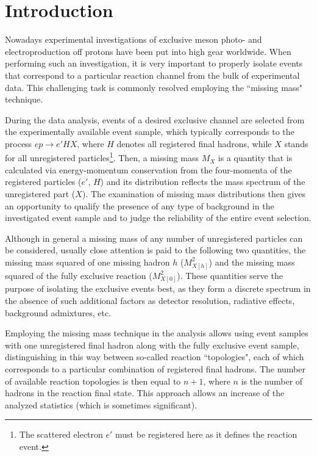 \newpage
\chapter{Introduction}
\mbox{}\vspace{-\baselineskip}


Nowadays experimental investigations of exclusive meson photo- and electroproduction off protons have been put into high gear worldwide. When performing such an investigation, it is very important to properly isolate events that correspond to a particular reaction channel from the bulk of experimental data. This challenging task is commonly resolved employing the ``missing mass" technique.

During the data analysis, events of a desired exclusive channel are selected from the experimentally available event sample, which typically corresponds to the process $ep \rightarrow e'HX$, where $H$ denotes all registered final hadrons, while $X$ stands for all unregistered particles\footnote[1]{The scattered electron $e'$ must be registered here as it defines the reaction event.}. Then, a missing mass $M_{X}$ is a quantity that is calculated via energy-momentum conservation from the four-momenta of the registered particles ($e'$, $H$) and its distribution reflects the mass spectrum of the unregistered part ($X$). The examination of missing mass distributions then gives an opportunity to qualify the presence of any type of background in the investigated event sample and to judge the reliability of the entire event selection.


Although in general a missing mass of any number of unregistered particles can be considered, usually close attention is paid to the following two quantities, the missing mass squared of one missing hadron $h$ ($M^{2}_{X[h]}$) and the missing mass squared of the fully exclusive reaction ($M^{2}_{X[0]}$). These quantities serve the purpose of isolating the exclusive events best, as they form a discrete spectrum in the absence of such additional factors as detector resolution, radiative effects, background admixtures, etc. 

Employing the missing mass technique in the analysis allows using event samples with one unregistered final hadron along with the fully exclusive event sample, distinguishing in this way between so-called reaction ``topologies", each of which corresponds to a particular combination of registered final hadrons.  The number of available reaction topologies is then equal to $n+1$, where $n$ is the number of hadrons in the reaction final state. This approach allows an increase of the analyzed statistics (which is sometimes significant).


